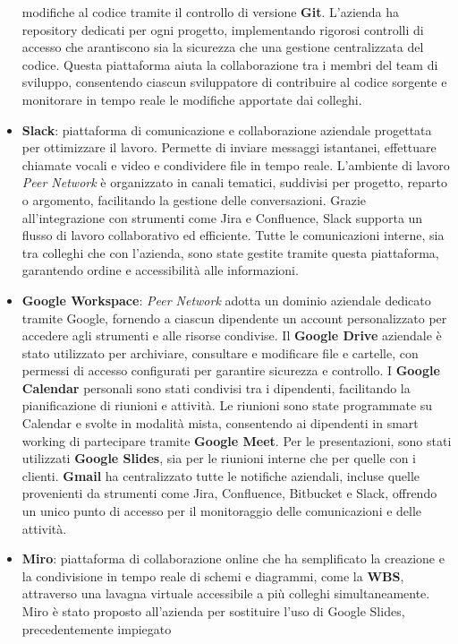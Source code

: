 \begin{itemize}
    modifiche al codice tramite il controllo di versione \textbf{Git}. L'azienda ha repository dedicati per ogni progetto, implementando rigorosi controlli di accesso che
    arantiscono sia la sicurezza che una gestione centralizzata del codice. Questa piattaforma aiuta la collaborazione tra i membri del team di sviluppo, consentendo
    ciascun sviluppatore di contribuire al codice sorgente e monitorare in tempo reale le modifiche apportate dai colleghi.
    \item \textbf{Slack}: piattaforma di comunicazione e collaborazione aziendale progettata per ottimizzare il lavoro. Permette di inviare messaggi istantanei, effettuare
    chiamate vocali e video e condividere file in tempo reale. L’ambiente di lavoro \textit{Peer Network} è organizzato in canali tematici, suddivisi per progetto, reparto o argomento,
    facilitando la gestione delle conversazioni. Grazie all’integrazione con strumenti come Jira e Confluence, Slack supporta un flusso di lavoro collaborativo ed efficiente.
    Tutte le comunicazioni interne, sia tra colleghi che con l’azienda, sono state gestite tramite questa piattaforma, garantendo ordine e accessibilità alle informazioni.
    \item \textbf{Google Workspace}: \textit{Peer Network} adotta un dominio aziendale dedicato tramite Google, fornendo a ciascun dipendente un account personalizzato
    per accedere agli strumenti e alle risorse condivise. Il \textbf{Google Drive} aziendale è stato utilizzato per archiviare, consultare e modificare file e cartelle, con permessi
    di accesso configurati per garantire sicurezza e controllo. I \textbf{Google Calendar} personali sono stati condivisi tra i dipendenti, facilitando la pianificazione di riunioni
    e attività. Le riunioni sono state programmate su Calendar e svolte in modalità mista, consentendo ai dipendenti in smart working di partecipare tramite \textbf{Google Meet}.
    Per le presentazioni, sono stati utilizzati \textbf{Google Slides}, sia per le riunioni interne che per quelle con i clienti. \textbf{Gmail} ha centralizzato tutte le notifiche aziendali,
    incluse quelle provenienti da strumenti come Jira, Confluence, Bitbucket e Slack, offrendo un unico punto di accesso per il monitoraggio delle comunicazioni e delle attività.
    \item \textbf{Miro}: piattaforma di collaborazione online che ha semplificato la creazione e la condivisione in tempo reale di schemi e diagrammi, come la \textbf{\ac{WBS}},
    attraverso una lavagna virtuale accessibile a più colleghi simultaneamente. Miro è stato proposto all'azienda per sostituire l’uso di Google Slides, precedentemente impiegato

\end{itemize}
